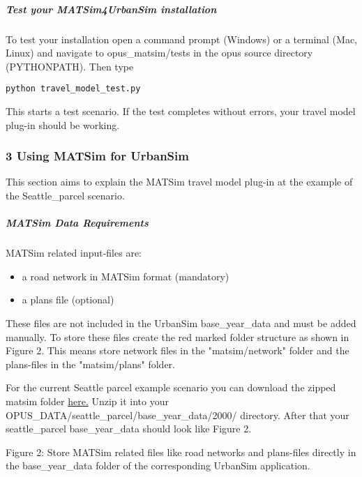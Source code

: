 \subparagraph{Test your MATSim4UrbanSim installation}

To test your installation open a command prompt (Windows) or a  terminal (Mac, Linux) and navigate to opus\_matsim/tests in the opus  source directory (PYTHONPATH). Then type


\texttt{python travel\_model\_test.py}

This starts a test scenario. If the test completes without errors, your travel model plug-in should be working.



\subsubsection{3 Using MATSim for UrbanSim}

This section aims to explain the MATSim travel model plug-in at the example of the Seattle\_parcel scenario.\textbf{}

\subparagraph{MATSim Data Requirements}

MATSim related input-files are:
\begin{itemize}
	\item a road network in MATSim format (mandatory)
	\item a plans file (optional)
\end{itemize}

These files are not included in the UrbanSim base\_year\_data and  must be added manually. To store these files create the red marked  folder structure as shown in Figure 2. This means store network files in  the "matsim/network" folder and the plans-files in the "matsim/plans"  folder.

For the current Seattle parcel example scenario you can download the zipped matsim folder \href{https://svn.vsp.tu-berlin.de/repos/public-svn/matsim/examples/countries/us/seattle/matsim.zip}{here.}  Unzip it into your OPUS\_DATA/seattle\_parcel/base\_year\_data/2000/  directory. After that your seattle\_parcel base\_year\_data should look  like Figure 2.



Figure 2: Store MATSim related files like road networks and  plans-files directly in the base\_year\_data folder of the corresponding  UrbanSim application.

